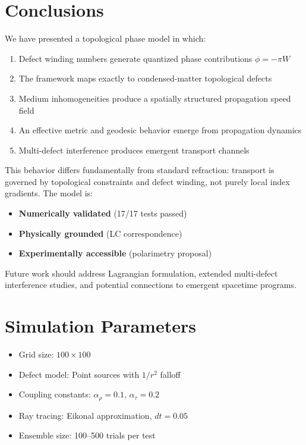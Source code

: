 \documentclass[11pt,a4paper]{article}
\begin{document}
\section{Conclusions}

We have presented a topological phase model in which:

\begin{enumerate}
    \item Defect winding numbers generate quantized phase contributions $\phi = -\pi W$
    \item The framework maps exactly to condensed-matter topological defects
    \item Medium inhomogeneities produce a spatially structured propagation speed field
    \item An effective metric and geodesic behavior emerge from propagation dynamics
    \item Multi-defect interference produces emergent transport channels
\end{enumerate}

This behavior differs fundamentally from standard refraction: transport is governed by topological constraints and defect winding, not purely local index gradients. The model is:
\begin{itemize}
    \item \textbf{Numerically validated} (17/17 tests passed)
    \item \textbf{Physically grounded} (LC correspondence)
    \item \textbf{Experimentally accessible} (polarimetry proposal)
\end{itemize}

Future work should address Lagrangian formulation, extended multi-defect interference studies, and potential connections to emergent spacetime programs.

\appendix

\section{Simulation Parameters}

\begin{itemize}
    \item Grid size: $100 \times 100$
    \item Defect model: Point sources with $1/r^2$ falloff
    \item Coupling constants: $\alpha_\rho = 0.1$, $\alpha_\tau = 0.2$
    \item Ray tracing: Eikonal approximation, $dt = 0.05$
    \item Ensemble size: 100--500 trials per test
\end{itemize}
\end{document}

